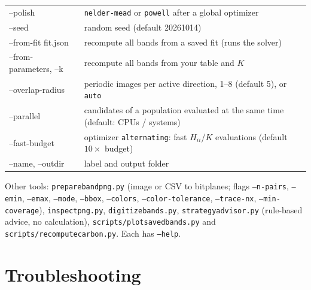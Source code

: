 \documentclass[11pt,a4paper]{article}
\newcommand{\cmd}[1]{\texttt{#1}}
\renewcommand{\_}{\origunderscore\allowbreak}
\begin{document}
\begin{center}
\begin{tabularx}{\textwidth}{>{\ttfamily}l L}
--polish & \cmd{nelder-mead} or \cmd{powell} after a global optimizer \\
--seed & random seed (default 20261014) \\
--from-fit fit.json & recompute all bands from a saved fit (runs the solver) \\
--from-parameters, --k & recompute all bands from your table and $K$ \\
--overlap-radius & periodic images per active direction, 1--8 (default 5), or \cmd{auto} \\
--parallel & candidates of a population evaluated at the same time (default: CPUs / systems) \\
--fast-budget & optimizer \cmd{alternating}: fast $H_{ii}$/$K$ evaluations (default $10\times$ budget) \\
--name, --outdir & label and output folder \\
\bottomrule
\end{tabularx}
\end{center}

Other tools: \cmd{prepare\_band\_png.py} (image or CSV to bitplanes; flags \cmd{--n-pairs},
\cmd{--emin}, \cmd{--emax}, \cmd{--mode}, \cmd{--bbox}, \cmd{--colors}, \cmd{--color-tolerance},
\cmd{--trace-nx}, \cmd{--min-coverage}), \cmd{inspect\_png.py}, \cmd{digitize\_bands.py},
\cmd{strategy\_advisor.py} (rule-based advice, no calculation), \cmd{scripts/plot\_saved\_bands.py} and
\cmd{scripts/recompute\_carbon.py}. Each has \cmd{--help}.

\section{Troubleshooting}
\end{document}

